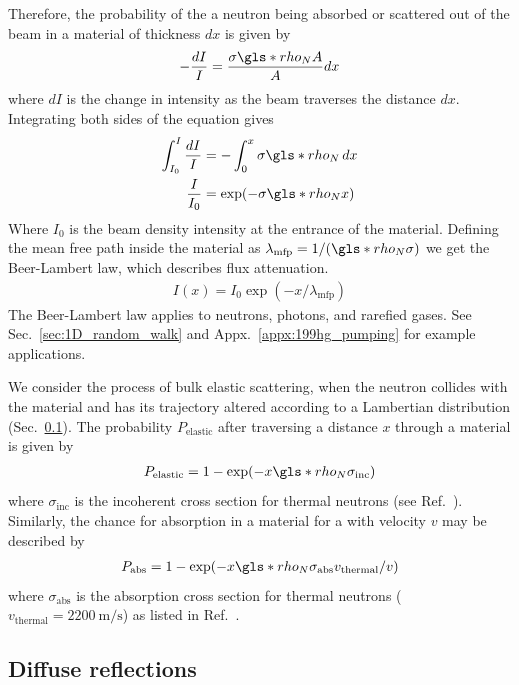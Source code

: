 Therefore, the probability of the a neutron being absorbed or scattered out of the beam in a material of thickness $dx$ is given by
%
\begin{gather}
    -\frac{dI}{I}=\frac{\sigma\gls*{rho_N} A}{A}dx
\end{gather}
%
where $dI$ is the change in intensity as the beam traverses the distance $dx$. Integrating both sides of the equation gives
%
\begin{align}
    \int^I_{I_0}\frac{dI}{I} &= -\int^x_0 \sigma \gls*{rho_N} \,dx \\
    \frac{I}{I_0} &= \exp(-\sigma \gls*{rho_N} x) \label{eq:beer_lambert_law_variant}
\end{align}
%
Where $I_0$ is the beam density intensity at the entrance of the material. Defining the mean free path inside the material as $\lambda_\text{mfp}=1/(\gls*{rho_N} \sigma)$ we get the Beer-Lambert law, which describes flux attenuation.
%
\begin{gather}
    I(x) = I_0 \exp(-x/\lambda_\text{mfp}) \label{eq:beer_lambert_law}
\end{gather}
%
 The Beer-Lambert law applies to neutrons, photons, and rarefied gases. See Sec.~\ref{sec:1D_random_walk} and Appx.~\ref{appx:199hg_pumping} for example applications.
 
 We consider the process of bulk elastic scattering, when the neutron collides with the material and has its trajectory altered according to a Lambertian distribution (Sec.~\ref{sec:diffuse_reflections}). The probability $P_\text{elastic}$ after traversing a distance $x$ through a material is given by
%
\begin{gather}
    P_\text{elastic}=1-\exp(-x \gls*{rho_N} \sigma_\text{inc})
\end{gather}
%
where $\sigma_\text{inc}$ is the incoherent cross section for thermal neutrons (see Ref.~\cite{nist_neutron_cross_sections}). Similarly, the chance for absorption in a material for a \ucn with velocity $v$ may be described by
%
\begin{gather}
    P_\text{abs}= 1-\exp(-x \gls*{rho_N} \sigma_\text{abs}v_\text{thermal}/v)
\end{gather}
%
where $\sigma_\text{abs}$ is the absorption cross section for thermal neutrons ($v_\text{thermal}=\qty{2200}{\meter\per \s}$) as listed in Ref.~\cite{nist_neutron_cross_sections}.


\subsection{Diffuse reflections}\label{sec:diffuse_reflections}


